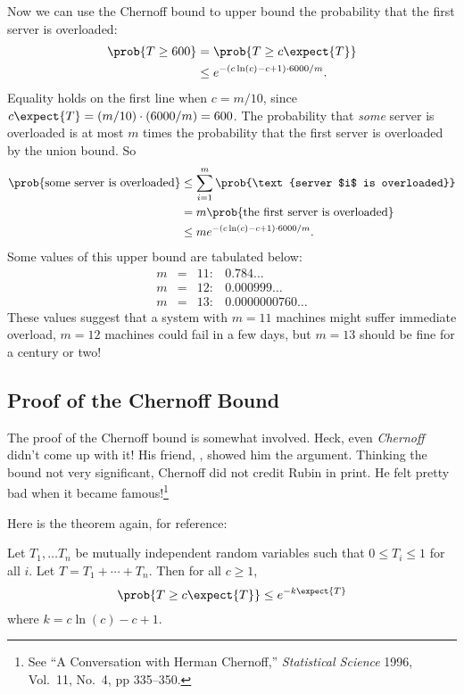 Now we can use the Chernoff bound to upper bound the probability that
the first server is overloaded:
\begin{align*}
\prob{T \geq 600} & = \prob{T \geq c \expect{T}} \\
  & \leq e^{-(c \ln(c) - c + 1) \cdot 6000 / m}.
\end{align*}
Equality holds on the first line when $c = m / 10$, since $c \expect{T} =
(m / 10) \cdot (6000 / m) = 600$.  The probability that \emph{some}
server is overloaded is at most $m$ times the probability that the
first server is overloaded by the union bound.  So
\begin{align*}
\prob{\text{some server is overloaded}}
    &\le \sum_{i = 1}^m \prob{\text{server $i$ is overloaded}} \\
    &= m \prob{\text{the first server is overloaded}} \\
    &\leq m e^{-(c \ln(c) - c + 1) \cdot 6000 / m}.
\end{align*}
Some values of this upper bound are tabulated below:
\[
\begin{array}{rcll}
m & = & 11: & 0.784\dots \\
m & = & 12: & 0.000999\dots \\
m & = & 13: & 0.0000000760\dots
\end{array}
\]
These values suggest that a system with $m = 11$ machines might suffer
immediate overload, $m = 12$ machines could fail in a few days, but $m
= 13$ should be fine for a century or two!

\subsection{Proof of the Chernoff Bound}\label{sec:chernoff_proof}

The proof of the Chernoff bound is somewhat involved.  Heck, even
\emph{Chernoff} didn't come up with it!  His friend, , showed him the argument.  Thinking the bound not very
significant, Chernoff did not credit Rubin in print.  He felt pretty
bad when it became famous!\footnote{See ``A Conversation with Herman
  Chernoff,'' \emph{Statistical Science} 1996, Vol.~11, No.~4, pp
  335--350.}

Here is the theorem again, for reference:

\begin{theorem}
Let $T_1, \dots T_n$ be mutually independent random variables such
that $0 \leq T_i \leq 1$ for all $i$.  Let $T = T_1 + \cdots + T_n$.
Then for all $c \geq 1$,
\begin{equation}\label{chernoff-leq}
\prob{T \geq c \expect{T}} \leq e^{-k \expect{T}}
\end{equation}
where $k = c \ln(c) - c + 1$.
\end{theorem}

